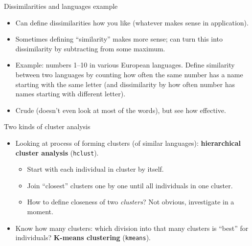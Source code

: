 \begin{frame}[fragile]{Dissimilarities and languages example}

  \begin{itemize}
  \item Can define dissimilarities how you like (whatever makes sense in application).
  \item Sometimes defining ``similarity'' makes more sense; can turn this into dissimilarity by subtracting from some maximum.
  \item Example: numbers 1--10 in various European languages. Define
    similarity between two languages by counting how often the same
    number has a name starting with the same letter (and dissimilarity
    by how often number has names starting with different letter).
  \item Crude (doesn't even look at most of the words), but see how effective.
  \end{itemize}
  
\end{frame}

\begin{frame}[fragile]{Two kinds of cluster analysis}

  \begin{itemize}
  \item Looking at process of forming clusters (of similar languages):
    \textbf{hierarchical cluster analysis} (\texttt{hclust}).
    \begin{itemize}
    \item Start with each individual in cluster by itself.
    \item Join ``closest'' clusters one by one until all individuals in one cluster.
    \item How to define closeness of two \emph{clusters}? Not obvious,
      investigate in a moment.
    \end{itemize}
  \item Know how many clusters: which division into that many clusters
    is ``best'' for individuals? \textbf{K-means clustering} (\texttt{kmeans}).
  \end{itemize}
  
\end{frame}


